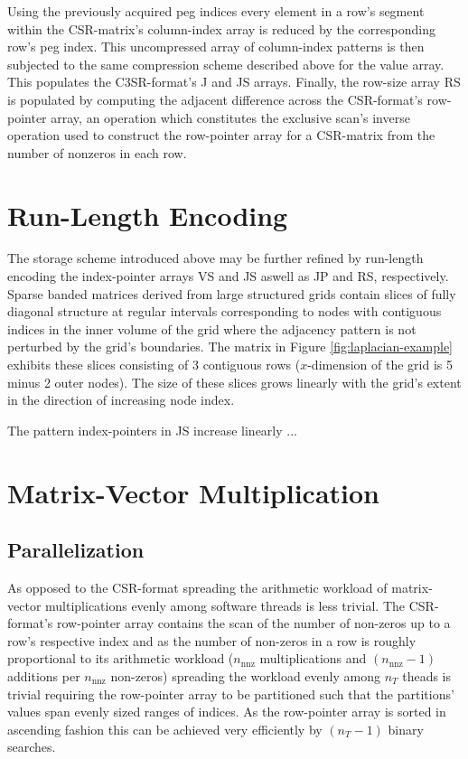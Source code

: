     Using the previously acquired peg indices every element in a row's segment within the CSR-matrix's column-index
    array is reduced by the corresponding row's peg index. This uncompressed array of column-index patterns is then
    subjected to the same compression scheme described above for the value array. This populates the C3SR-format's J and
    JS arrays. Finally, the row-size array RS is populated by computing the adjacent difference across the CSR-format's
    row-pointer array, an operation which constitutes the exclusive scan's inverse operation used to construct the
    row-pointer array for a CSR-matrix from the number of nonzeros in each row.

  \section{Run-Length Encoding}


    The storage scheme introduced above may be further refined by run-length encoding the index-pointer arrays VS and
    JS aswell as JP and RS, respectively. Sparse banded matrices derived from large structured grids contain slices of
    fully diagonal structure at regular intervals corresponding to nodes with contiguous indices in the inner volume
    of the grid where the adjacency pattern is not perturbed by the grid's boundaries. The matrix in Figure
    \ref{fig:laplacian-example} exhibits these slices consisting of 3 contiguous rows ($x$-dimension of the grid is 5
    minus 2 outer nodes). The size of these slices grows linearly with the grid's extent in the direction of
    increasing node index.

    The pattern index-pointers in JS increase linearly ...

  \section{Matrix-Vector Multiplication}

    \subsection{Parallelization}

      As opposed to the CSR-format spreading the arithmetic workload of matrix-vector multiplications evenly among
      software threads is less trivial. The CSR-format's row-pointer array contains the scan of the number of non-zeros
      up to a row's respective index and as the number of non-zeros in a row is roughly proportional to its arithmetic
      workload ($n_\text{nnz}$ multiplications and $(n_\text{nnz} - 1)$ additions per $n_\text{nnz}$ non-zeros)
      spreading the workload evenly among $n_T$ theads is trivial requiring the row-pointer array to be partitioned such
      that the partitions' values span evenly sized ranges of indices. As the row-pointer array is sorted in ascending
      fashion this can be achieved very efficiently by $(n_T - 1)$ binary searches.

